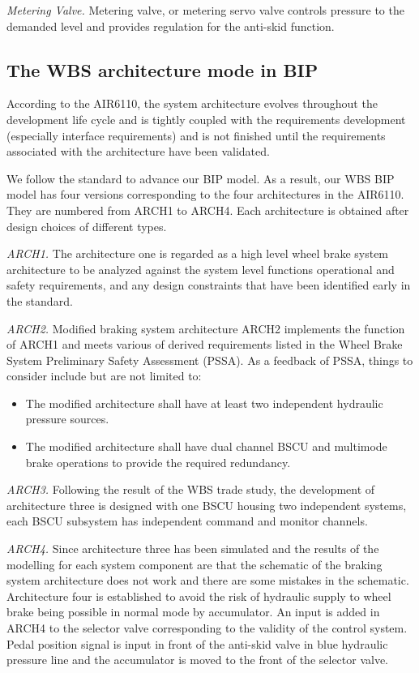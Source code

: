 \emph{Metering Valve.} Metering valve, or metering servo valve controls pressure to the demanded level and provides regulation for the anti-skid function.

\subsection{The WBS architecture mode in BIP}

According to the AIR6110, the system architecture evolves throughout the development life cycle and is tightly coupled with the requirements development (especially interface requirements) and is not finished until the requirements associated with the architecture have been validated.

We follow the standard to advance our BIP model. As a result, our WBS BIP model has four versions corresponding to the four architectures in the AIR6110. They are numbered from ARCH1 to ARCH4. Each architecture is obtained after design choices of different types.

\emph{ARCH1.} The architecture one is regarded as a high level wheel brake system architecture to be analyzed against the system level functions operational and safety requirements, and any design constraints that have been identified early in the standard.

\emph{ARCH2.} Modified braking system architecture ARCH2 implements the function of ARCH1 and meets various of derived requirements listed in the Wheel Brake System Preliminary Safety Assessment (PSSA). As a feedback of PSSA, things to consider include but are not limited to:

\begin{itemize}
\item The modified architecture shall have at least two independent hydraulic pressure sources.
\item The modified architecture shall have dual channel BSCU and multimode brake operations to provide the required redundancy.
\end{itemize}

\emph{ARCH3.} Following the result of the WBS trade study, the development of architecture three is designed with one BSCU housing two independent systems, each BSCU subsystem has independent command and monitor channels.


\emph{ARCH4.} Since architecture three has been simulated and the results of the modelling for each system component are that the schematic of the braking system architecture does not work and there are some mistakes in the schematic. Architecture four is established to avoid the risk of hydraulic supply to wheel brake being possible in normal mode by accumulator. An input is added in ARCH4 to the selector valve corresponding to the validity of the control system. Pedal position signal is input in front of the anti-skid valve in blue hydraulic pressure line and the accumulator is moved to the front of the selector valve.

